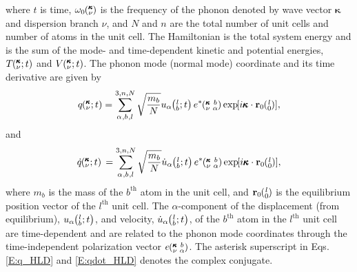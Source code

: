 \documentclass[twocolumn,10pt]{asme2e}
\newcommand{\SUM}[2]{\ifthenelse{\equal{#1}{0}}{\sum_{\alpha_{#2},b_{#2},l_{#2}}^{3,n,N}} {\ifthenelse{\equal{#1}{1}}{\sum_{\alpha_{#2},b_{#2}}^{3,n}}{\sum_{\pmb{\kappa}#2,\nu#2}^{N,3n}}}}
\newcommand{\EXP}[1]{\exp\mspace{-5.0mu}\left[#1\right]\mspace{-3.0mu}}
\newcommand{\ab}[2]{\mspace{-4.0mu}\left(\mspace{-8.0mu}\begin{smallmatrix}&\ifthenelse{\equal{#1}{}}{a}{#1} \\&\ifthenelse{\equal{#2}{}}{b}{#2}\end{smallmatrix}\mspace{-3.0mu}\right)}
\newcommand{\kvba}{\mspace{-4.0mu}\left(\mspace{-8.0mu}\begin{smallmatrix} &\pmb{\kappa} &b \\ &\nu &\alpha\end{smallmatrix}\mspace{-3.0mu}\right)}
\newcommand{\kvt}{\mspace{-4.0mu}\left(\mspace{-8.0mu}\begin{smallmatrix}&\pmb{\kappa} \\&\nu\end{smallmatrix}\mspace{-2.0mu};t\right)}
\newcommand{\kv}{\mspace{-4.0mu}\left(\mspace{-8.0mu}\begin{smallmatrix}&\pmb{\kappa} \\&\nu\end{smallmatrix}\mspace{-3.0mu}\right)}
\newcommand{\lbt}{\mspace{-4.0mu}\left(\mspace{-8.0mu}\begin{smallmatrix}&l \\&b\end{smallmatrix}\mspace{-2.0mu};t\right)}
\begin{document}



where $t$ is time, $\omega_0\kv$ is the frequency of the phonon denoted by
wave vector $\pmb{\kappa}$ and dispersion branch $\nu$, and $N$ and $n$ are
the total number of unit cells and number of atoms in the unit cell.  The
Hamiltonian is the total system energy and is the sum of the mode- and
time-dependent kinetic and potential energies, $T\kvt$ and $V\kvt$.  The
phonon mode (normal mode) coordinate and its time derivative are given by
\begin{equation}\label{E:q_HLD}
q\kvt=\SUM{0}{}\sqrt{\frac{m_b}{N}}u_{\alpha}\lbt e^*\kvba\EXP{i\pmb{\kappa}\cdot\mathbf{r}_0\ab{l}{0}},
\end{equation}
and
\begin{equation}\label{E:qdot_HLD}
\dot{q}\kvt{}{}{}=\SUM{0}{}\sqrt{\frac{m_b}{N}}\dot{u}_{\alpha}\lbt e^*\kvba\EXP{i\pmb{\kappa}\cdot\mathbf{r}_0\ab{l}{0}},
\end{equation}
where $m_b$ is the mass of the $b^{\textrm{th}}$ atom in the unit cell, and
$\mathbf{r}_0\ab{l}{0}$ is the equilibrium position vector of the
$l^{\textrm{th}}$ unit cell. The $\alpha$-component of the displacement (from
equilibrium), $u_{\alpha}\lbt$, and velocity, $\dot{u}_{\alpha}\lbt$, of the
$b^{\textrm{th}}$ atom in the $l^{\textrm{th}}$ unit cell are time-dependent
and are related to the phonon mode coordinates through the time-independent
polarization vector $e\kvba$. The asterisk superscript in Eqs$.$
\eqref{E:q_HLD} and \eqref{E:qdot_HLD} denotes the complex conjugate.
\end{document}
